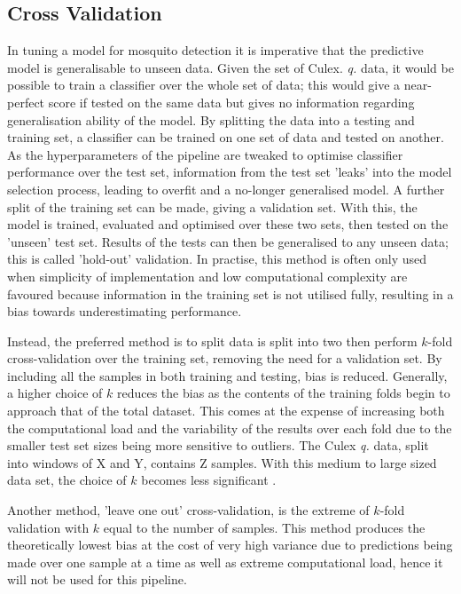     \subsection{Cross Validation}
    \label{subsec:exp-clf-xval}
        In tuning a model for mosquito detection it is imperative that the predictive model is generalisable to unseen data. Given the set of Culex. \textit{q.} data, it would be possible to train a classifier over the whole set of data; this would give a near-perfect score if tested on the same data but gives no information regarding generalisation ability of the model. By splitting the data into a testing and training set, a classifier can be trained on one set of data and tested on another. As the hyperparameters of the pipeline are tweaked to optimise classifier performance over the test set, information from the test set 'leaks' into the model selection process, leading to overfit and a no-longer generalised model. A further split of the training set can be made, giving a validation set. With this, the model is trained, evaluated and optimised over these two sets, then tested on the 'unseen' test set. Results of the tests can then be generalised to any unseen data; this is called 'hold-out' validation. In practise, this method is often only used when simplicity of implementation and low computational complexity are favoured because information in the training set is not utilised fully, resulting in a bias towards underestimating performance.
     
        Instead, the preferred method is to split data is split into two then perform $k$-fold cross-validation over the training set, removing the need for a validation set. By including all the samples in both training and testing, bias is reduced. Generally, a higher choice of $k$ reduces the bias as the contents of the training folds begin to approach that of the total dataset. This comes at the expense of increasing both the computational load and the variability of the results over each fold due to the smaller test set sizes being more sensitive to outliers. The Culex \textit{q.} data, split into windows of X and Y, contains Z samples. With this medium to large sized data set, the choice of $k$ becomes less significant \cite{Kohavi1995}. 
        
        Another method, 'leave one out' cross-validation, is the extreme of $k$-fold validation with $k$ equal to the number of samples. This method produces the theoretically lowest bias at the cost of very high variance due to predictions being made over one sample at a time as well as extreme computational load, hence it will not be used for this pipeline.

